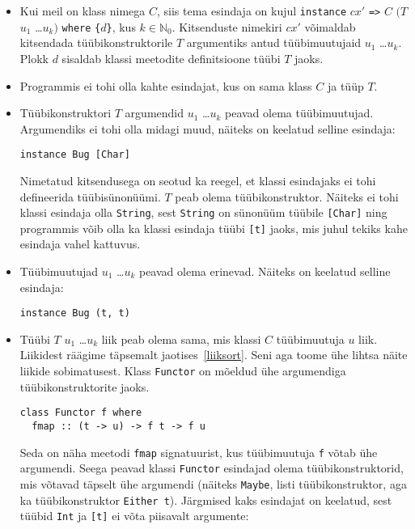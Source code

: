 \documentclass[12pt]{article}
\begin{document}
        \begin{itemize}
          \item
            Kui meil on klass nimega $C$, siis tema esindaja on kujul \verb!instance! $cx'$ \verb!=>! $C$ $(T$ $u_1$ \ldots $u_k)$ \verb!where! \verb!{!$d$\verb!}!, kus $k\in\mathbb{N}_0$. Kitsenduste nimekiri $cx'$ võimaldab kitsendada tüübikonstruktorile $T$ argumentiks antud tüübimuutujaid $u_1$ \ldots $u_k$. Plokk $d$ sisaldab klassi meetodite definitsioone tüübi $T$ jaoks.
          \item
            Programmis ei tohi olla kahte esindajat, kus on sama klass $C$ ja tüüp $T$.
          \item
            Tüübikonstruktori $T$ argumendid $u_1$ \ldots $u_k$ peavad olema tüübimuutujad. Argumendiks ei tohi olla midagi muud, näiteks on keelatud selline esindaja:

            \begin{verbatim}instance Bug [Char]\end{verbatim}

            Nimetatud kitsendusega on seotud ka reegel, et klassi esindajaks ei tohi defineerida tüübisünonüümi. $T$ peab olema tüübikonstruktor. Näiteks ei tohi klassi esindaja olla \verb!String!, sest \verb!String! on sünonüüm tüübile \verb![Char]! ning programmis võib olla ka klassi esindaja tüübi \verb![t]! jaoks, mis juhul tekiks kahe esindaja vahel kattuvus.
          \item
            Tüübimuutujad $u_1$ \ldots $u_k$ peavad olema erinevad. Näiteks on keelatud selline esindaja:

            \begin{verbatim}instance Bug (t, t)\end{verbatim}
          \item
            Tüübi $T$ $u_1$ \ldots $u_k$ liik peab olema sama, mis klassi $C$ tüübimuutuja $u$ liik. Liikidest räägime täpsemalt jaotises~\ref{liiksort}. Seni aga toome ühe lihtsa näite liikide sobimatusest. Klass \verb!Functor! on mõeldud ühe argumendiga tüübikonstruktorite jaoks.

            \begin{verbatim}class Functor f where
  fmap :: (t -> u) -> f t -> f u\end{verbatim}

            Seda on näha meetodi \verb!fmap! signatuurist, kus tüübimuutuja \verb!f! võtab ühe argumendi. Seega peavad klassi \verb!Functor! esindajad olema tüübikonstruktorid, mis võtavad täpselt ühe argumendi (näiteks \verb!Maybe!, listi tüübikonstruktor, aga ka tüübikonstruktor \verb!Either t!). Järgmised kaks esindajat on keelatud, sest tüübid \verb!Int! ja \verb![t]! ei võta piisavalt argumente:


\end{itemize}
\end{document}
